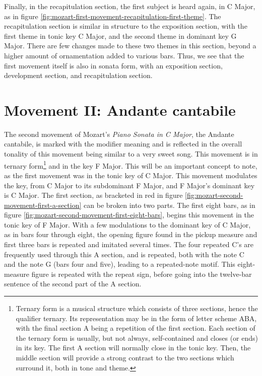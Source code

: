 Finally, in the recapitulation section, the first subject is heard again, in C Major, as in figure \ref{fig:mozart-first-movement-recapitulation-first-theme}\autocite{Henle_1977}. The recapitulation section is similar in structure to the exposition section, with the first theme in tonic key C Major, and the second theme in dominant key G Major. There are few changes made to these two themes in this section, beyond a higher amount of ornamentation added to various bars. Thus, we see that the first movement itself is also in sonata form, with an exposition section, development section, and recapitulation section.

\section{Movement II: Andante cantabile}

The second movement of Mozart's \textit{Piano Sonata in C Major}, the Andante cantabile, is marked with the modifier  meaning  and is reflected in the overall tonality of this movement being similar to a very sweet song. This movement is in ternary form\footnote{Ternary form is a musical structure which consists of three sections, hence the qualifier ternary. Its representation may be in the form of letter scheme ABA, with the final section A being a repetition of the first section. Each section of the ternary form is usually, but not always, self-contained and closes (or ends) in its key. The first A section will normally close in the tonic key. Then, the middle section will provide a strong contrast to the two sections which surround it, both in tone and theme.} and in the key F Major. This will be an important concept to note, as the first movement was in the tonic key of C Major. This movement modulates the key, from C Major to its subdominant F Major, and F Major's dominant key is C Major. The first  section, as bracketed in red in figure \ref{fig:mozart-second-movement-first-a-section}\autocite{Henle_1977} can be broken into two parts. The first eight bars, as in figure \ref{fig:mozart-second-movement-first-eight-bars}\autocite{Henle_1977}, begins this movement in the tonic key of F Major. With a few modulations to the dominant key of C Major, as in bars four through eight, the opening figure found in the pickup measure and first three bars is repeated and imitated several times. The four repeated C's are frequently used through this A section, and is repeated, both with the note C and the note G (bars four and five), leading to a repeated-note motif. This eight-measure figure is repeated with the repeat sign, before going into the twelve-bar sentence of the second part of the A section. 

